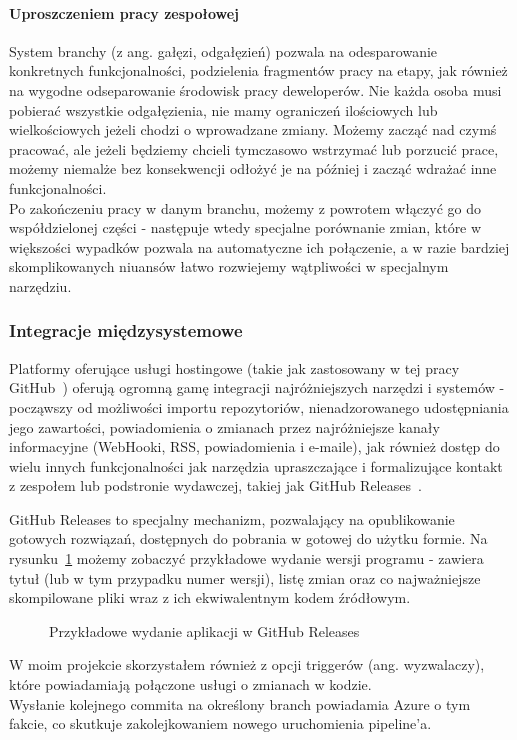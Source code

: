 \paragraph{Uproszczeniem pracy zespołowej}
System branchy (z ang. gałęzi, odgałęzień) pozwala na odesparowanie konkretnych funkcjonalności, 
podzielenia fragmentów pracy na etapy, jak również na wygodne odseparowanie środowisk pracy deweloperów.
Nie każda osoba musi pobierać wszystkie odgałęzienia, nie mamy ograniczeń ilościowych lub wielkościowych 
jeżeli chodzi o wprowadzane zmiany. Możemy zacząć nad czymś pracować, ale jeżeli będziemy chcieli tymczasowo 
wstrzymać lub porzucić prace, możemy niemalże bez konsekwencji odłożyć je na później i zacząć wdrażać 
inne funkcjonalności.\\%
Po zakończeniu pracy w danym branchu, możemy z powrotem włączyć go do współdzielonej części - następuje 
wtedy specjalne porównanie zmian, które w większości wypadków pozwala na automatyczne ich połączenie, 
a w razie bardziej skomplikowanych niuansów łatwo rozwiejemy wątpliwości w specjalnym narzędziu.

\subsubsection{Integracje międzysystemowe}
Platformy oferujące usługi hostingowe (takie jak zastosowany w tej pracy GitHub~\cite{github}) oferują 
ogromną gamę integracji najróżniejszych narzędzi i systemów - począwszy od możliwości importu 
repozytoriów, nienadzorowanego udostępniania jego zawartości, powiadomienia o zmianach przez najróżniejsze 
kanały informacyjne (WebHooki, RSS, powiadomienia i e-maile), jak również dostęp do wielu innych 
funkcjonalności jak narzędzia upraszczające i formalizujące kontakt z zespołem 
lub podstronie wydawczej, takiej jak GitHub Releases~\cite{githubReleases}.

GitHub Releases to specjalny mechanizm, pozwalający na opublikowanie gotowych rozwiązań, dostępnych do 
pobrania w gotowej do użytku formie. Na rysunku~\ref{img:githubReleases_sample} możemy zobaczyć 
przykładowe wydanie wersji programu - zawiera tytuł (lub w tym przypadku numer wersji), listę zmian 
oraz co najważniejsze skompilowane pliki wraz z ich ekwiwalentnym kodem źródłowym.
\begin{figure}[ht]
    \centering
    \caption{Przykładowe wydanie aplikacji w GitHub Releases}
    \label{img:githubReleases_sample}
\end{figure}

W moim projekcie skorzystałem również z opcji triggerów (ang. wyzwalaczy), które powiadamiają 
połączone usługi o zmianach w kodzie. \\%
Wysłanie kolejnego commita na określony branch powiadamia 
Azure o tym fakcie, co skutkuje zakolejkowaniem nowego uruchomienia pipeline'a.